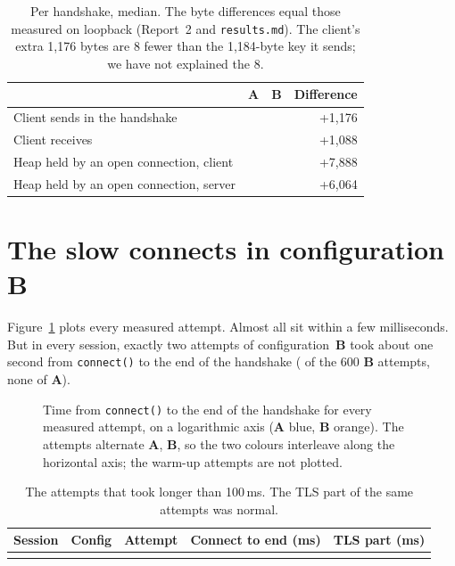 \documentclass[11pt,a4paper]{article}
\newcommand{\scatterpanel}[4]{%
  \begin{axis}[width=4.1cm, height=5.2cm, ymode=log, ymin=0.5, ymax=3000,
      title={\small Session #2}, xlabel={attempt}, scale only axis,
      axis lines=left, ymajorgrids, grid style={black!12}, tick label style={font=\scriptsize},
      ytick={1,10,100,1000}, yticklabels={1,10,100,1000}, xmin=0, xmax=215,
      xtick={0,100,200}, at={(#3,0)}, #4]
    \addplot+[only marks, mark=*, mark size=0.9pt, colorA, draw=none, fill=colorA, opacity=0.6]
      table[x=attempt, y=total_ms, col sep=comma] {data3/scatter_#1_A.csv};
    \addplot+[only marks, mark=*, mark size=0.9pt, colorB, draw=none, fill=colorB, opacity=0.6]
      table[x=attempt, y=total_ms, col sep=comma] {data3/scatter_#1_B.csv};
  \end{axis}}
\newcommand{\cA}{\textcolor{colorA}{\textbf{A}}}
\newcommand{\cB}{\textcolor{colorB}{\textbf{B}}}
\begin{document}
\begin{table}[!htbp]
\centering
\begin{tabular}{@{}l rr r@{}}
\toprule
 & \cA{} & \cB{} & Difference\\
\midrule
Client sends in the handshake & \CtxA{} & \CtxB{} & +1{,}176\\
Client receives & \CrxA{} & \CrxB{} & +1{,}088\\
Heap held by an open connection, client & \ChA{} & \ChB{} & +7{,}888\\
Heap held by an open connection, server & \ShA{} & \ShB{} & +6{,}064\\
\bottomrule
\end{tabular}
\caption{Per handshake, median. The byte differences equal those measured on loopback (Report~2 and \texttt{results.md}). The
client's extra 1{,}176 bytes are 8 fewer than the 1{,}184-byte key it sends; we have not explained the 8.}
\label{tab:bytes}
\end{table}

\section{The slow connects in configuration B}
\label{sec:slow}

Figure~\ref{fig:scatter} plots every measured attempt. Almost all sit within a few milliseconds.
But in every session, exactly two attempts of configuration~\cB{} took about one second from
\texttt{connect()} to the end of the handshake (\NSlow{} of the 600 \cB{} attempts, none of \cA{}).

\begin{figure}[!htbp]
\centering
{}
\caption{Time from \texttt{connect()} to the end of the handshake for every measured attempt, on a
logarithmic axis (\cA{} blue, \cB{} orange). The attempts alternate \cA{}, \cB{}, so the two colours
interleave along the horizontal axis; the warm-up attempts are not plotted.}
\label{fig:scatter}
\end{figure}

\begin{table}[!htbp]
\centering
\begin{tabular}{@{}ccrrr@{}}
\toprule
Session & Config & Attempt & Connect to end (ms) & TLS part (ms)\\
\midrule
\\
\bottomrule
\end{tabular}
\caption{The attempts that took longer than 100\,ms. The TLS part of the same attempts was normal.}
\label{tab:slow}
\end{table}
\end{document}
